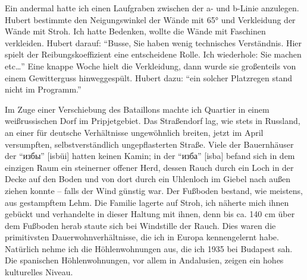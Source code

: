 \documentclass[a5paper,pagesize,10pt,twoside=true]{scrbook}
\newcommand\textcyr[1]{{\fontencoding{OT2}\fontfamily{wncyr}\selectfont #1}}	%
\begin{document}
Ein andermal hatte ich einen Laufgraben zwischen der a- und b-Linie anzulegen. Hubert bestimmte den Neigungswinkel der Wände mit 65° und Verkleidung der Wände mit Stroh. Ich hatte Bedenken, wollte die Wände mit Faschinen verkleiden. Hubert darauf: \enquote{Busse, Sie haben wenig technisches Verständnis. Hier spielt der Reibungskoeffizient eine entscheidene Rolle. Ich wiederhole: Sie machen etc\dots} Eine knappe Woche hielt die Verkleidung, dann wurde sie großenteils von einem Gewitterguss hinweggespült. Hubert dazu: \enquote{ein solcher Platzregen stand nicht im Programm.}

Im Zuge einer Verschiebung des Bataillons machte ich Quartier in einem weißrussischen Dorf im Pripjetgebiet. Das Straßendorf lag, wie stets in Russland, an einer für deutsche Verhältnisse ungewöhnlich breiten, jetzt im April versumpften, selbstverständlich ungepflasterten Straße. Viele der Bauernhäuser der \enquote{\textcyr{избы}} [isbüi] hatten keinen Kamin; in der \enquote{\textcyr{изба}} [isba] befand sich in dem einzigen Raum ein steinerner offener Herd, dessen Rauch durch ein Loch in der Decke auf den Boden und von dort durch ein Uhlenloch im Giebel nach außen ziehen konnte -- falls der Wind günstig war. Der Fußboden bestand, wie meistens, aus gestampftem Lehm. Die Familie lagerte auf Stroh, ich näherte mich ihnen gebückt und verhandelte in dieser Haltung mit ihnen, denn bis ca. 140 cm über dem Fußboden herab staute sich bei Windstille der Rauch. Dies waren die primitivsten Dauerwohnverhältnisse, die ich in Europa kennengelernt habe. Natürlich nehme ich die Höhlenwohnungen aus, die ich 1935 bei Budapest sah. Die spanischen Höhlenwohnungen, vor allem in Andalusien, zeigen ein hohes kulturelles Niveau.
\end{document}
